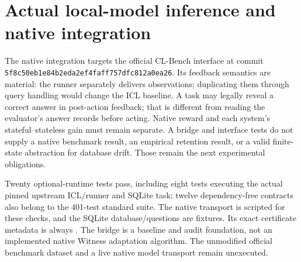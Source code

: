 \section{Actual local-model inference and native integration}


The native integration targets the official CL-Bench interface at commit
\texttt{5f8c50eb1e84b2eda2ef4faff757dfc812a0ea26}. Its feedback semantics are
material: the runner separately delivers observations; duplicating them through
query handling would change the ICL baseline. A task may legally reveal a correct
answer in post-action feedback; that is different from reading the evaluator's
answer records before acting. Native reward and each system's stateful--stateless
gain must remain separate. A bridge and interface tests do not supply a native
benchmark result, an empirical retention result, or a valid finite-state
abstraction for database drift. Those remain the next experimental obligations.


Twenty optional-runtime tests pass, including eight tests executing the actual
pinned upstream ICL/runner and SQLite task; twelve dependency-free contracts also
belong to the 401-test standard suite. The native transport is scripted for these
checks, and the SQLite database/questions are fixtures. Its exact certificate
metadata is always \unk. The bridge is a baseline and audit foundation, not an
implemented native Witness adaptation algorithm. The unmodified official
benchmark dataset and a live native model transport remain unexecuted.
